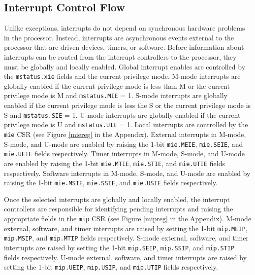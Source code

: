 \documentclass[12pt]{article}
\begin{document}
\subsection{Interrupt Control Flow}
Unlike exceptions, interrupts do not depend on synchronous hardware problems in the processor. Instead, interrupts are asynchronous events external to the processor that are driven devices, timers, or software. Before information about interrupts can be routed from the interrupt controllers to the processor, they must be globally and locally enabled. Global interrupt enables are controlled by the {\tt{mstatus.xie}} fields and the current privilege mode. M-mode interrupts are globally enabled if the current privilege mode is less than M or the current privilege mode is M and {\tt{mstatus.MIE}} = 1. S-mode interrupts are globally enabled if the current privilege mode is less the S or the current privilege mode is S and {\tt{mstatus.SIE}} = 1. U-mode interrupts are globally enabled if the current privilege mode is U and {\tt{mstatus.UIE}} = 1. Local interrupts are controlled by the {\tt{mie}} CSR (see Figure \ref{miereg} in the Appendix). External interrupts in M-mode, S-mode, and U-mode are enabled by raising the 1-bit {\tt{mie.MEIE}}, {\tt{mie.SEIE}}, and {\tt{mie.UEIE}} fields respectively. Timer interrupts in M-mode, S-mode, and U-mode are enabled by raising the 1-bit {\tt{mie.MTIE}}, {\tt{mie.STIE}}, and {\tt{mie.UTIE}} fields respectively. Software interrupts in M-mode, S-mode, and U-mode are enabled by raising the 1-bit {\tt{mie.MSIE}}, {\tt{mie.SSIE}}, and {\tt{mie.USIE}} fields respectively. 

Once the selected interrupts are globally and locally enabled, the interrupt controllers are responsible for identifying pending interrupts and raising the appropriate fields in the {\tt{mip}} CSR (see Figure \ref{mipreg} in the Appendix). M-mode external, software, and timer interrupts are raised by setting the 1-bit {\tt{mip.MEIP}}, {\tt{mip.MSIP}}, and {\tt{mip.MTIP}} fields respectively. S-mode external, software, and timer interrupts are raised by setting the 1-bit {\tt{mip.SEIP}}, {\tt{mip.SSIP}}, and {\tt{mip.STIP}} fields respectively. U-mode external, software, and timer interrupts are raised by setting the 1-bit {\tt{mip.UEIP}}, {\tt{mip.USIP}}, and {\tt{mip.UTIP}} fields respectively. 
\end{document}
